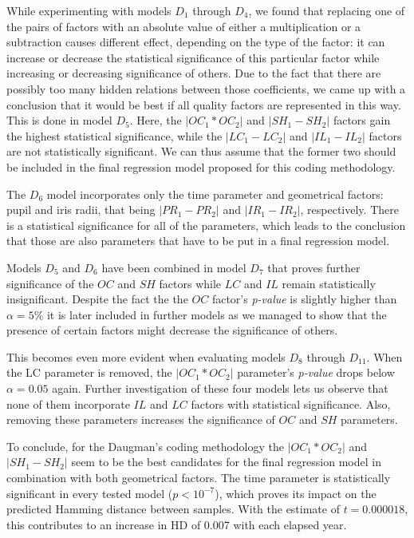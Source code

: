 \documentclass{article}
\begin{document}
While experimenting with models $D_1$ through $D_4$, we found that replacing one of the pairs of factors with an absolute value of either a multiplication or a subtraction causes different effect, depending on the type of the factor: it can increase or decrease the statistical significance of this particular factor while increasing or decreasing significance of others. Due to the fact that there are possibly too many hidden relations between those coefficients, we came up with a conclusion that it would be best if all quality factors are represented in this way. This is done in model $D_5$. Here, the $|OC_1 * OC_2|$ and $|SH_1 - SH_2|$ factors gain the highest statistical significance, while the $|LC_1 - LC_2|$ and $|IL_1 - IL_2|$ factors are not statistically significant. We can thus assume that the former two should be included in the final regression model proposed for this coding methodology. 

The $D_6$ model incorporates only the time parameter and geometrical factors: pupil and iris radii, that being $|PR_1 - PR_2|$ and $|IR_1 - IR_2|$, respectively. There is a statistical significance for all of the parameters, which leads to the conclusion that those are also parameters that have to be put in a final regression model. 

Models $D_5$ and $D_6$ have been combined in model $D_7$ that proves further significance of the $OC$ and $SH$ factors while $LC$ and $IL$ remain statistically insignificant. Despite the fact the the $OC$ factor's \emph{p-value} is slightly higher than $\alpha=5\%$ it is later included in further models as we managed to show that the presence of certain factors might decrease the significance of others.

This becomes even more evident when evaluating models $D_8$ through $D_{11}$. When the LC parameter is removed, the $|OC_1 * OC_2|$ parameter's \emph{p-value} drops below $\alpha = 0.05$ again. Further investigation of these four models lets us observe that none of them incorporate $IL$ and $LC$ factors with statistical significance. Also, removing these parameters increases the significance of $OC$ and $SH$ parameters. 

To conclude, for the Daugman's coding methodology the $|OC_1 * OC_2|$ and $|SH_1 - SH_2|$ seem to be the best candidates for the final regression model in combination with both geometrical factors. The time parameter is statistically significant in every tested model ($p < 10^{-7}$), which proves its impact on the predicted Hamming distance between samples. With the estimate of $t = 0.000018$, this contributes to an increase in HD of 0.007 with each elapsed year.
\end{document}

